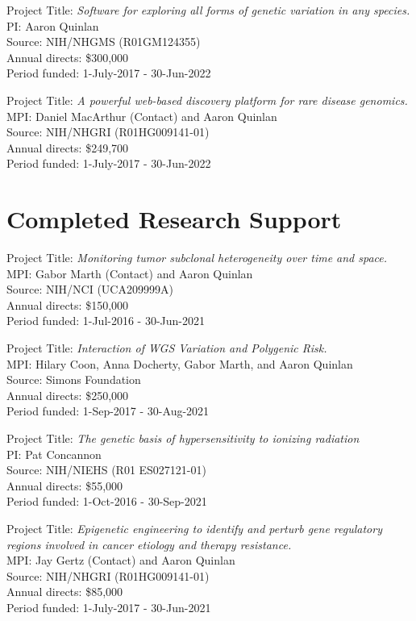 \documentclass[margin,line]{cv}
\begin{document}
\begin{resume}
    Project Title: \textit{Software for exploring all forms of genetic variation in any species.} \\
    PI: Aaron Quinlan \\
    Source: NIH/NHGMS (R01GM124355) \\
    Annual directs: \$300,000 \\
    Period funded: 1-July-2017 - 30-Jun-2022

    Project Title: \textit{A powerful web-based discovery platform for rare disease genomics.} \\
    MPI: Daniel MacArthur (Contact) and Aaron Quinlan \\
    Source: NIH/NHGRI (R01HG009141-01) \\
    Annual directs: \$249,700 \\
    Period funded: 1-July-2017 - 30-Jun-2022


    \section{\mysidestyle Completed Research Support}

    Project Title: \textit{Monitoring tumor subclonal heterogeneity over time and space.} \\
    MPI: Gabor Marth (Contact) and Aaron Quinlan \\
    Source: NIH/NCI (UCA209999A) \\
    Annual directs: \$150,000 \\
    Period funded: 1-Jul-2016 - 30-Jun-2021 

    Project Title: \textit{Interaction of WGS Variation and Polygenic Risk.} \\
    MPI: Hilary Coon, Anna Docherty, Gabor Marth, and Aaron Quinlan \\
    Source: Simons Foundation \\
    Annual directs: \$250,000 \\
    Period funded: 1-Sep-2017 - 30-Aug-2021 

    Project Title: \textit{The genetic basis of hypersensitivity to ionizing radiation} \\
    PI: Pat Concannon \\
    Source: NIH/NIEHS (R01 ES027121-01) \\
    Annual directs: \$55,000 \\
    Period funded: 1-Oct-2016 - 30-Sep-2021 

    Project Title: \textit{Epigenetic engineering to identify and perturb gene regulatory regions involved in cancer etiology and therapy resistance.} \\
    MPI: Jay Gertz (Contact) and Aaron Quinlan \\
    Source: NIH/NHGRI (R01HG009141-01) \\
    Annual directs: \$85,000 \\
    Period funded: 1-July-2017 - 30-Jun-2021 


\end{resume}
\end{document}
